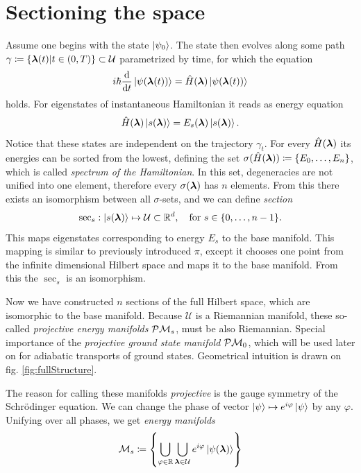 \section{Sectioning the space}
Assume one begins with the state $\ket{\psi_0}$. The state then evolves along some path $\gamma\coloneqq\{{\bm\lambda}(t)|t\in(0,T)\}\subset \mathcal U$ parametrized by time, for which the \Schrodinger equation
\begin{equation}
    i\hbar \frac{\mathrm{d} }{\mathrm{d} t}\ket{\psi({\bm\lambda}(t))} = \hat{H}({\bm\lambda})\ket{\psi({\bm\lambda}(t))}
    \label{eq:schrodinger}
\end{equation}
holds. For eigenstates of instantaneous Hamiltonian it reads as energy \Schrodinger equation
\begin{equation}
    \hat{H}({\bm\lambda})\ket{s({\bm\lambda})}=E_s({\bm\lambda})\ket{s({\bm\lambda})}.
    \label{eq:energySchrodinger}
\end{equation}
Notice that these states are independent on the trajectory $\gamma_t$.
For every $\hat{H}({\bm\lambda})$ its energies can be sorted from the lowest, defining the set $\sigma(\hat{H}({\bm\lambda}))\coloneqq\{E_0,\dots,E_n\}$, which is called \emph{spectrum of the Hamiltonian}. In this set, degeneracies are not unified into one element, therefore every $\sigma({\bm\lambda})$ has $n$ elements. From this there exists an isomorphism between all $\sigma$-sets, and we can define \emph{section} 
$$\mathrm{sec}_s: \ket{s({\bm\lambda})}\mapsto \mathcal{U}\subset \mathbb{R}^d, \quad \text{for } s\in\{0,\dots, n-1\}.$$
This maps eigenstates corresponding to energy $E_s$ to the base manifold. This mapping is similar to previously introduced $\pi$, except it chooses one point from the infinite dimensional Hilbert space and maps it to the base manifold. From this the $\sec_s$ is an isomorphism. 

Now we have constructed $n$ sections of the full Hilbert space, which are isomorphic to the base manifold. Because $\mathcal U$ is a Riemannian manifold, these so-called \emph{projective energy manifolds} $\mathcal{P}\mathcal{M}_s$, must be also Riemannian.
Special importance of the \emph{projective ground state manifold} $\mathcal{P}\mathcal{M}_0$, which will be used later on for adiabatic transports of ground states. Geometrical intuition is drawn on fig. \ref{fig:fullStructure}. 

The reason for calling these manifolds \emph{projective} is the gauge symmetry of the Schr\"odinger equation. We can change the phase of vector $\ket{\psi}\mapsto e^{i\varphi}\ket{\psi}$ by any $\varphi$. Unifying over all phases, we get \emph{energy manifolds}
\begin{equation}
    \mathcal{M}_s\coloneqq \left\{\bigcup_{\varphi\in\mathbb{R}} \bigcup_{{\bm\lambda}\in\mathcal U} e^{i\varphi}\ket{\psi({\bm\lambda})}\right\}
\end{equation}

